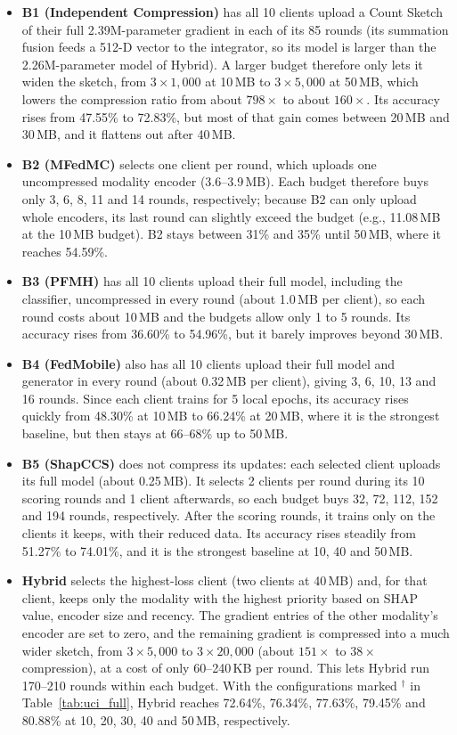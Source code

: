 \documentclass[sigconf]{acmart}
\newcommand{\method}{Hybrid}   %
\begin{document}
\begin{itemize}
  \item \textbf{B1 (Independent Compression)} has all 10 clients upload a
  Count Sketch of their full 2.39M-parameter gradient in each of its 85 rounds
  (its summation fusion feeds a 512-D vector to the integrator, so its model is
  larger than the 2.26M-parameter model of \method{}). A larger budget
  therefore only lets it widen the sketch, from $3\times1{,}000$ at 10\,MB to
  $3\times5{,}000$ at 50\,MB, which lowers the compression ratio from about
  $798\times$ to about $160\times$. Its accuracy rises from 47.55\% to
  72.83\%, but most of that gain comes between 20\,MB and 30\,MB, and it
  flattens out after 40\,MB.
  \item \textbf{B2 (MFedMC)} selects one client per round, which uploads one
  uncompressed modality encoder (3.6--3.9\,MB). Each budget therefore buys only
  3, 6, 8, 11 and 14 rounds, respectively; because B2 can only upload whole
  encoders, its last round can slightly exceed the budget (e.g., 11.08\,MB at
  the 10\,MB budget). B2 stays between 31\% and 35\% until 50\,MB, where it
  reaches 54.59\%.
  \item \textbf{B3 (PFMH)} has all 10 clients upload their full model,
  including the classifier, uncompressed in every round (about 1.0\,MB per
  client), so each round costs about 10\,MB and the budgets allow only 1 to 5
  rounds. Its accuracy rises from 36.60\% to 54.96\%, but it barely improves
  beyond 30\,MB.
  \item \textbf{B4 (FedMobile)} also has all 10 clients upload their full model
  and generator in every round (about 0.32\,MB per client), giving 3, 6, 10, 13
  and 16 rounds. Since each client trains for 5 local epochs, its accuracy rises
  quickly from 48.30\% at 10\,MB to 66.24\% at 20\,MB, where it is the
  strongest baseline, but then stays at 66--68\% up to 50\,MB.
  \item \textbf{B5 (ShapCCS)} does not compress its updates: each selected
  client uploads its full model (about 0.25\,MB). It selects 2 clients per
  round during its 10 scoring rounds and 1 client afterwards, so each budget
  buys 32, 72, 112, 152 and 194 rounds, respectively. After the scoring rounds,
  it trains only on the clients it keeps, with their reduced data. Its accuracy
  rises steadily from 51.27\% to 74.01\%, and it is the strongest baseline at
  10, 40 and 50\,MB.
  \item \textbf{\method{}} selects the highest-loss client (two clients at
  40\,MB) and, for that client, keeps only the modality with the highest
  priority based on SHAP value, encoder size and recency. The gradient entries
  of the other modality's encoder are set to zero, and the remaining gradient
  is compressed into a much wider sketch, from $3\times5{,}000$ to
  $3\times20{,}000$ (about $151\times$ to $38\times$ compression), at a cost of
  only 60--240\,KB per round. This lets \method{} run 170--210 rounds within
  each budget. With the configurations marked $^\dagger$ in Table~\ref{tab:uci_full},
  \method{} reaches 72.64\%, 76.34\%, 77.63\%, 79.45\% and 80.88\% at 10, 20,
  30, 40 and 50\,MB, respectively.
\end{itemize}
\end{document}
